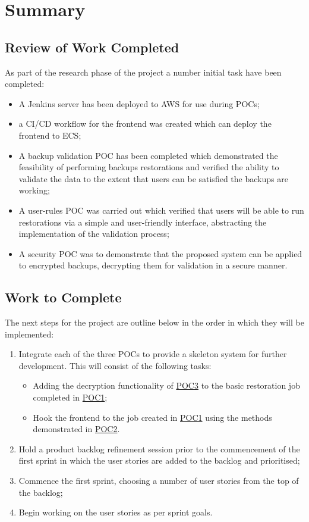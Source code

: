 
\section{Summary}
	\subsection{Review of Work Completed}
	As part of the research phase of the project a number  initial task have been completed:
	\begin{itemize}
		\item A Jenkins server has been deployed to AWS for use during POCs;
		\item a CI/CD workflow for the frontend was created  which can deploy the frontend to ECS;
		\item A backup validation POC has been completed which demonstrated the feasibility of performing backups restorations and verified the ability to validate the data to the extent that users can be satisfied the backups are working;
		\item A user-rules POC was carried out which verified that users will be able to run restorations via a simple and user-friendly interface, abstracting the implementation of the validation process;
		\item A security POC was to demonstrate that the proposed system can be applied to encrypted backups, decrypting them for validation in a secure manner.
	\end{itemize}
	
	\subsection{Work to Complete}
	The next steps for the project are outline below in the order in which they will be implemented:
	\begin{enumerate}
		\item Integrate each of the three POCs to provide a skeleton system for further development. This will consist of the following tasks:
		\begin{itemize}
			\item Adding the decryption functionality of \hyperref[poc1]{POC3} to the basic restoration job completed in \hyperref[poc1]{POC1};
			\item Hook the frontend to the job created in \hyperref[poc1]{POC1} using the methods demonstrated in \hyperref[poc1]{POC2}.
		\end{itemize}
		\item Hold a product backlog refinement session prior to the commencement of the first sprint in which the user stories are added to the backlog and prioritised;
		\item Commence the first sprint, choosing a number of user stories from the top of the backlog;
		\item Begin working on the user stories as per sprint goals.
	\end{enumerate}
    
